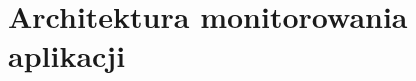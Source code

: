 \chapter[Architektura monitorowania aplikacji]{Architektura monitorowania aplikacji}
\label{chapter:monitoring_architecture}
